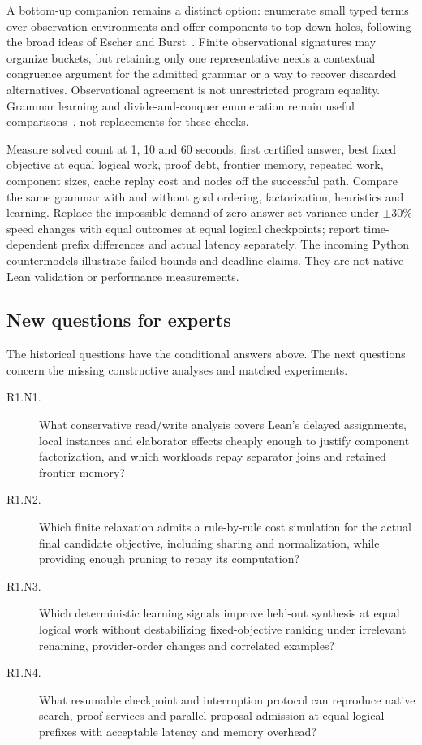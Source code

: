 A bottom-up companion remains a distinct option: enumerate small typed terms
over observation environments and offer components to top-down holes, following
the broad ideas of Escher and Burst~\cite{escher,burst}. Finite observational
signatures may organize buckets, but retaining only one representative needs
a contextual congruence argument for the admitted grammar or a way to recover
discarded alternatives. Observational agreement is not unrestricted program
equality. Grammar learning and divide-and-conquer enumeration remain useful
comparisons~\cite{deepcoder,eusolver,transit}, not replacements for these checks.

Measure solved count at 1, 10 and 60 seconds, first certified answer, best fixed
objective at equal logical work, proof debt, frontier memory, repeated work,
component sizes, cache replay cost and nodes off the successful path. Compare
the same grammar with and without goal ordering, factorization, heuristics
and learning. Replace the impossible demand of zero answer-set variance under
$\pm30\%$ speed changes with equal outcomes at equal logical checkpoints;
report time-dependent prefix differences and actual latency separately.
The incoming Python countermodels illustrate failed bounds and deadline
claims. They are not native Lean validation or performance measurements.

\subsection{New questions for experts}\label{sec:search-new-questions}
The historical questions have the conditional answers above. The next questions
concern the missing constructive analyses and matched experiments.
\begin{description}
\item[R1.N1.] What conservative read/write analysis covers Lean's delayed
assignments, local instances and elaborator effects cheaply enough to justify
component factorization, and which workloads repay separator joins and retained
frontier memory?
\item[R1.N2.] Which finite relaxation admits a rule-by-rule cost simulation for
the actual final candidate objective, including sharing and normalization, while
providing enough pruning to repay its computation?
\item[R1.N3.] Which deterministic learning signals improve held-out synthesis
at equal logical work without destabilizing fixed-objective ranking under
irrelevant renaming, provider-order changes and correlated examples?
\item[R1.N4.] What resumable checkpoint and interruption protocol can reproduce
native search, proof services and parallel proposal admission at equal logical
prefixes with acceptable latency and memory overhead?
\end{description}
